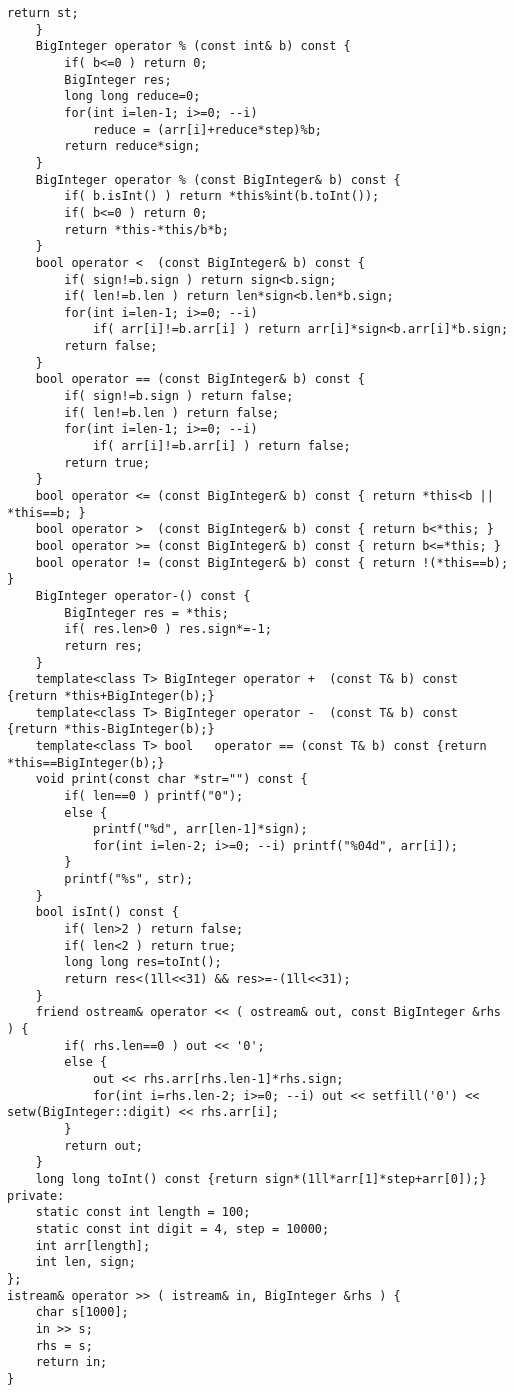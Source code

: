 \documentclass[11pt,twocolumn,a4paper]{article}
\begin{document}
\begin{lstlisting}[label=BigInteger]
		return st;
	}
	BigInteger operator % (const int& b) const {
		if( b<=0 ) return 0;
		BigInteger res;
		long long reduce=0;
		for(int i=len-1; i>=0; --i)
			reduce = (arr[i]+reduce*step)%b;
		return reduce*sign;
	}
	BigInteger operator % (const BigInteger& b) const {
		if( b.isInt() ) return *this%int(b.toInt());
		if( b<=0 ) return 0;
		return *this-*this/b*b;
	}
	bool operator <  (const BigInteger& b) const {
		if( sign!=b.sign ) return sign<b.sign;
		if( len!=b.len ) return len*sign<b.len*b.sign;
		for(int i=len-1; i>=0; --i)
			if( arr[i]!=b.arr[i] ) return arr[i]*sign<b.arr[i]*b.sign;
		return false;
	}
	bool operator == (const BigInteger& b) const {
		if( sign!=b.sign ) return false;
		if( len!=b.len ) return false;
		for(int i=len-1; i>=0; --i)
			if( arr[i]!=b.arr[i] ) return false;
		return true;
	}
	bool operator <= (const BigInteger& b) const { return *this<b || *this==b; }
	bool operator >  (const BigInteger& b) const { return b<*this; }
	bool operator >= (const BigInteger& b) const { return b<=*this; }
	bool operator != (const BigInteger& b) const { return !(*this==b); }
	BigInteger operator-() const {
		BigInteger res = *this;
		if( res.len>0 ) res.sign*=-1;
		return res;
	}
	template<class T> BigInteger operator +  (const T& b) const {return *this+BigInteger(b);}
	template<class T> BigInteger operator -  (const T& b) const {return *this-BigInteger(b);}
	template<class T> bool   operator == (const T& b) const {return *this==BigInteger(b);}
	void print(const char *str="") const {
		if( len==0 ) printf("0");
		else {
			printf("%d", arr[len-1]*sign);
			for(int i=len-2; i>=0; --i) printf("%04d", arr[i]);
		}
		printf("%s", str);
	}
	bool isInt() const {
		if( len>2 ) return false;
		if( len<2 ) return true;
		long long res=toInt();
		return res<(1ll<<31) && res>=-(1ll<<31);
	}
	friend ostream& operator << ( ostream& out, const BigInteger &rhs ) {
		if( rhs.len==0 ) out << '0';
		else {
			out << rhs.arr[rhs.len-1]*rhs.sign;
			for(int i=rhs.len-2; i>=0; --i) out << setfill('0') << setw(BigInteger::digit) << rhs.arr[i];
		}
		return out;
	}
	long long toInt() const {return sign*(1ll*arr[1]*step+arr[0]);}
private:
	static const int length = 100;
	static const int digit = 4, step = 10000;
	int arr[length];
	int len, sign;
};
istream& operator >> ( istream& in, BigInteger &rhs ) {
	char s[1000];
	in >> s;
	rhs = s;
	return in;
}
\end{lstlisting}
\end{document}
